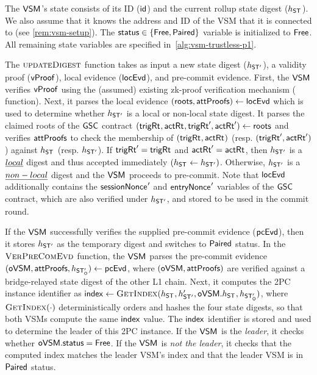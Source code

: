  The $\mathsf{VSM}_{}$'s state consists of its ID ($\mathsf{id}{}$) and the current rollup state digest ($h_{\mathsf{ST_{}}}$). We also assume that it knows the address and ID of the VSM that it is connected to (see \cref{rem:vsm-setup}). The $\mathsf{status} \in \{\mathsf{Free}, \mathsf{Paired} \}$ variable is initialized to $\mathsf{Free}$. All remaining state variables are specified in~\cref{alg:vsm-trustless-p1}.

 The $\textproc{updateDigest}$ function takes as input a new state digest ($h_{\mathsf{ST_{}'}}$), a validity proof ($\mathsf{vProof}$), local evidence ($\mathsf{locEvd}$), and pre-commit evidence. First, the $\mathsf{VSM}_{}$ verifies $\mathsf{vProof}$ using the (assumed) existing zk-proof verification mechanism ( function). Next, it parses the local evidence $(\mathsf{roots}, \mathsf{attProofs}) \gets \mathsf{locEvd}$ which is used to determine whether $h_{\mathsf{ST_{}'}}$ is a local or non-local state digest. It parses the claimed roots of the $\mathsf{GSC}$ contract  $(\mathsf{trigRt}_{\mathsf{}}, \mathsf{actRt}_{\mathsf{}},  \mathsf{trigRt}_{\mathsf{}}', \mathsf{actRt}_{\mathsf{}}') \gets \mathsf{roots}$ and verifies $\mathsf{attProofs}$ to check the membership of $(\mathsf{trigRt}_{\mathsf{}}, \mathsf{actRt}_{\mathsf{}})$ (resp. $(\mathsf{trigRt}_{\mathsf{}}', \mathsf{actRt}_{\mathsf{}}')$) against $h_{\mathsf{ST_{}}}$ (resp. $h_{\mathsf{ST_{}'}}$). If $\mathsf{trigRt}_{\mathsf{}}' = \mathsf{trigRt}_{\mathsf{}}$ and $\mathsf{actRt}_{\mathsf{}}' = \mathsf{actRt}_{\mathsf{}}$, then $h_{\mathsf{ST_{}'}}$ is a $\emph{local}$ digest and thus accepted immediately $(h_{\mathsf{ST_{}}} \gets h_{\mathsf{ST_{}'}})$. Otherwise, $h_{\mathsf{ST_{}'}}$ is a $\emph{non-local}$ digest and the $\mathsf{VSM}_{}$ proceeds to pre-commit. Note that $\mathsf{locEvd}$ additionally contains the $\mathsf{sessionNonce_{}}'$ and $\mathsf{entryNonce_{}}'$ variables of the $\mathsf{GSC}$ contract, which are also verified under $h_{\mathsf{ST_{}'}}$, and stored to be used in the commit round. 

 If the $\mathsf{VSM}_{}$ successfully verifies the supplied pre-commit evidence ($\mathsf{pcEvd}$), then it stores $h_{\mathsf{ST_{}'}}$ as the temporary digest and switches to $\mathsf{Paired}$ status.
 In the $\textproc{VerPreComEvd}$ function, the $\mathsf{VSM}_{}$ parses the pre-commit evidence $(\mathsf{oVSM}, \mathsf{attProofs}, h_{\mathsf{ST_{O}'}}) \gets \mathsf{pcEvd}$, where $(\mathsf{oVSM}, \mathsf{attProofs})$ are verified against a bridge-relayed state digest of the other L1 chain. Next, it computes the 2PC instance identifier as $\idx \gets \textproc{GetIndex}(\dst{}, \dstt{}', \ovsm.\dst{}, \dstt{O})$, where $\textproc{GetIndex}(\cdot)$ deterministically orders and hashes the four state digests, so that both VSMs compute the same $\mathsf{index}$ value. The $\mathsf{index}$ identifier is stored and used to determine the leader of this 2PC instance. If the $\mathsf{VSM}_{}$ is the \textit{leader}, it checks whether $\mathsf{oVSM}.\mathsf{status} = \mathsf{Free}$. If the $\mathsf{VSM}_{}$ is \textit{not the leader}, it checks that the computed index matches the leader VSM's index and that the leader VSM is in $\mathsf{Paired}$ status.



